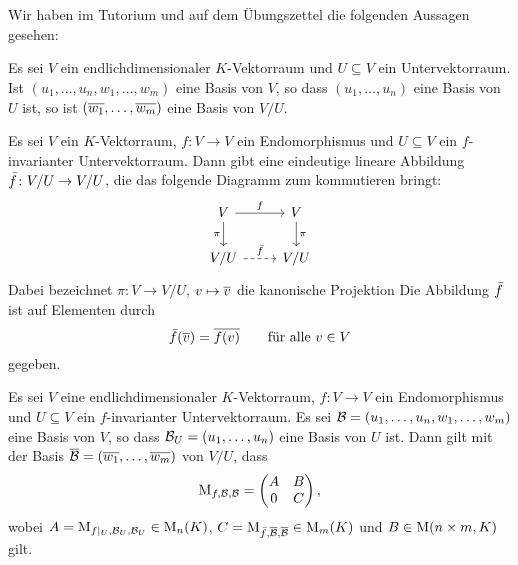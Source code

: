 \section{}

Wir haben im Tutorium und auf dem Übungszettel die folgenden Aussagen gesehen:

\begin{lemma}
  Es sei $V$ ein endlichdimensionaler $K$-Vektorraum und $U \subseteq V$ ein Untervektorraum.
  Ist $(u_1, \dotsc, u_n, w_1, \dotsc, w_m)$ eine Basis von $V$, so dass $(u_1, \dotsc, u_n)$ eine Basis von $U$ ist, so ist $(\overline{w_1}, \dotsc, \overline{w_m})$ eine Basis von $V/U$.
\end{lemma}


\begin{lemma}
  Es sei $V$ ein $K$-Vektorraum, $f \colon V \to V$ ein Endomorphismus und $U \subseteq V$ ein $f$-invarianter Untervektorraum.
  Dann gibt eine eindeutige lineare Abbildung $\bar{f} \colon V/U \to V/U$, die das folgende Diagramm zum kommutieren bringt:
  \[
    \begin{tikzcd}
        V
        \arrow{r}{f}
        \arrow[swap]{d}{\pi}
      & V
        \arrow{d}{\pi}
      \\
        V/U
        \arrow[densely dashed]{r}{\induced{f}}
      & V/U
    \end{tikzcd}
  \]
  Dabei bezeichnet $\pi \colon V \to V/U$, $v \mapsto \overline{v}$ die kanonische Projektion
  Die Abbildung $\bar{f}$ ist auf Elementen durch
  \[
    \bar{f}(\overline{v}) = \overline{f(v)}
    \qquad
    \text{für alle $v \in V$}
  \]
  gegeben.
\end{lemma}

\begin{lemma}
  \label{lemma: block form coming from invariant subspaces}
  Es sei $V$ eine endlichdimensionaler $K$-Vektorraum, $f \colon V \to V$ ein Endomorphismus und $U \subseteq V$ ein $f$-invarianter Untervektorraum.
  Es sei $\mathcal{B} = (u_1, \dotsc, u_n, w_1, \dotsc, w_m)$ eine Basis von $V$, so dass $\mathcal{B}_U = (u_1, \dotsc, u_n)$ eine Basis von $U$ ist.
  Dann gilt mit der Basis $\overline{\mathcal{B}} = (\overline{w_1}, \dotsc, \overline{w_m})$ von $V/U$, dass
  \[
      \operatorname{M}_{f, \mathcal{B}, \mathcal{B}}
    = \begin{pmatrix}
        A & B
      \\
        0 & C
      \end{pmatrix},
  \]
  wobei $A = \operatorname{M}_{f|_U, \mathcal{B}_U, \mathcal{B}_U} \in \operatorname{M}_{n}(K)$, $C = \operatorname{M}_{\bar{f}, \overline{\mathcal{B}}, \overline{\mathcal{B}}} \in \operatorname{M}_{m}(K)$ und $B \in \operatorname{M}(n \times m, K)$ gilt.
\end{lemma}


